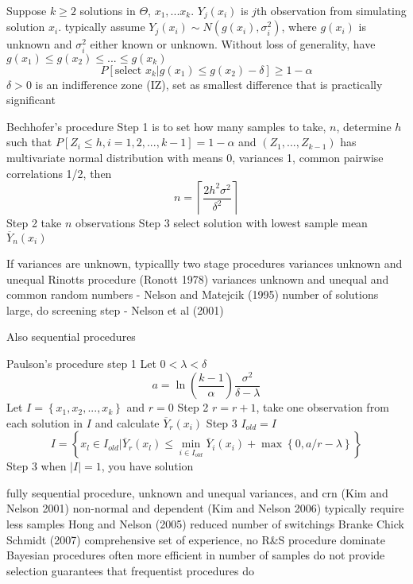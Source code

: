 Suppose $k \ge 2$ solutions in $\Theta$, $x_1, ... x_k$.  $Y_j (x_i)$ is $j$th observation from simulating solution $x_i$.  typically assume $Y_j (x_i) \sim N(g(x_i), \sigma_i^2 )$, where $g(x_i)$ is unknown and $\sigma_i^2$ either known or unknown.  Without loss of generality, have $g(x_1) \le g(x_2) \le ... \le g(x_k)$
\begin{equation}
P[ \mbox{select } x_k | g(x_1) \le g(x_2) - \delta ] \ge 1 - \alpha
\end{equation}
$\delta > 0$ is an indifference zone (IZ), set as smallest difference that is practically significant

Bechhofer's procedure
Step 1 is to set how many samples to take, $n$, determine $h$ such that $P [ Z_i \le h, i=1,2,...,k-1 ] = 1-\alpha$ and $(Z_1, ..., Z_{k-1})$ has multivariate normal distribution with means 0, variances 1, common pairwise correlations 1/2, then
\begin{equation}
n = \left\lceil \frac{ 2h^2\sigma^2}{\delta^2} \right\rceil
\end{equation}
Step 2 take $n$ observations
Step 3 select solution with lowest sample mean $\overline{Y}_n (x_i)$

If variances are unknown, typicallly two stage procedures
variances unknown and unequal Rinotts procedure (Ronott 1978)
variances unknown and unequal and common random numbers - Nelson and Matejcik (1995)
number of solutions large, do screening step - Nelson et al (2001)

Also sequential procedures

Paulson's procedure
step 1 Let $0 < \lambda < \delta$
\begin{equation}
a = \ln \left( \frac{k-1}{\alpha} \right) \frac{\sigma^2}{\delta - \lambda}
\end{equation}
Let $I = \left\{ x_1, x_2, ..., x_k \right\}$ and $r=0$
Step 2 $r = r+1$, take one observation from each solution in $I$ and calculate $\overline{Y}_r(x_i)$
Step 3 $I_{old} = I$
\begin{equation}
I = \left\{ x_l \in I_{old} | \overline{Y}_r(x_l) \le \min_{i \in I_{old}} \overline{Y}_i(x_i) + \max \left\{ 0, a/r - \lambda \right\} \right\}
\end{equation}
Step 3 when $| I | = 1$, you have solution

fully sequential procedure, unknown and unequal variances, and crn (Kim and Nelson 2001)
non-normal and dependent (Kim and Nelson 2006)
typically require less samples
Hong and Nelson (2005) reduced number of switchings
Branke Chick Schmidt (2007) comprehensive set of experience, no R\&S procedure dominate
Bayesian procedures often more efficient in number of samples
do not provide selection guarantees that frequentist procedures do


